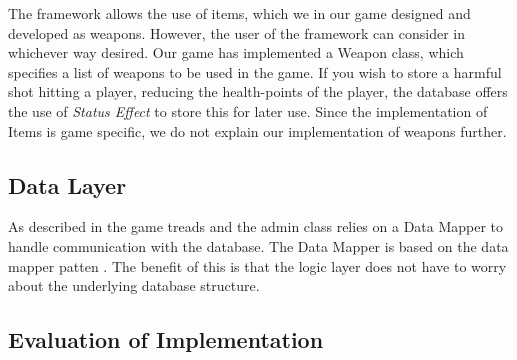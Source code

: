 The framework allows the use of items, which we in our game designed and developed as weapons. However, the user of the framework can consider in whichever way desired. Our game has implemented a Weapon class, which specifies a list of weapons to be used in the game. If you wish to store a harmful shot hitting a player, reducing the health-points of the player, the database offers the use of \textit{Status Effect} to store this for later use. Since the implementation of Items is game specific, we do not explain our implementation of weapons further.







\subsection{Data Layer}
As described in  the game treads and the admin class relies on a Data Mapper to handle communication with the database. The Data Mapper is based on the data mapper patten . The benefit of this is that the logic layer does not have to worry about the underlying database structure.



\subsection{Evaluation of Implementation}
